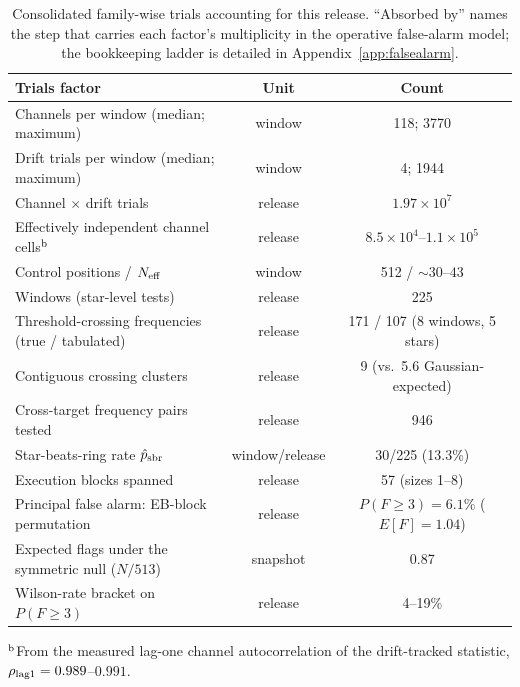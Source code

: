 \documentclass{openjournal}
\begin{document}
\begin{table}
\centering
\small
\setlength{\tabcolsep}{4pt}
\caption{Consolidated family-wise trials accounting for this release.
``Absorbed by'' names the step that carries each factor's
multiplicity in the operative false-alarm model; the bookkeeping
ladder is detailed in Appendix~\ref{app:falsealarm}.}
\label{tab:trials}
\begin{tabular}{@{}lcc@{}}
\hline
Trials factor & Unit & Count \\
\hline
Channels per window (median; maximum) & window & 118; 3770 \\
Drift trials per window (median; maximum) & window & 4; 1944 \\
Channel $\times$ drift trials & release & $1.97\times10^{7}$ \\
Effectively independent channel cells$^{\rm b}$ & release & $8.5\times10^{4}$--$1.1\times10^{5}$ \\
Control positions / $N_{\rm eff}$ & window & 512 / ${\sim}30$--$43$ \\
Windows (star-level tests) & release & 225 \\
Threshold-crossing frequencies (true / tabulated) & release & 171 / 107 (8 windows, 5 stars) \\
Contiguous crossing clusters & release & 9 (vs.\ 5.6 Gaussian-expected) \\
Cross-target frequency pairs tested & release & 946 \\
Star-beats-ring rate $\hat{p}_{\rm sbr}$ & window/release & 30/225 (13.3\%) \\
Execution blocks spanned & release & 57 (sizes 1--8) \\
\quad Principal false alarm: EB-block permutation & release & $P(F{\geq}3)=6.1$\% ($E[F]{=}1.04$) \\
\quad Expected flags under the symmetric null ($N/513$) & snapshot & 0.87 \\
\quad Wilson-rate bracket on $P(F{\geq}3)$ & release & 4--19\% \\
\hline
\end{tabular}
\parbox{\columnwidth}{\footnotesize $^{\rm b}$From the measured
lag-one channel autocorrelation of the drift-tracked statistic,
$\rho_{\rm lag1}=0.989$--$0.991$.}
\end{table}
\end{document}
